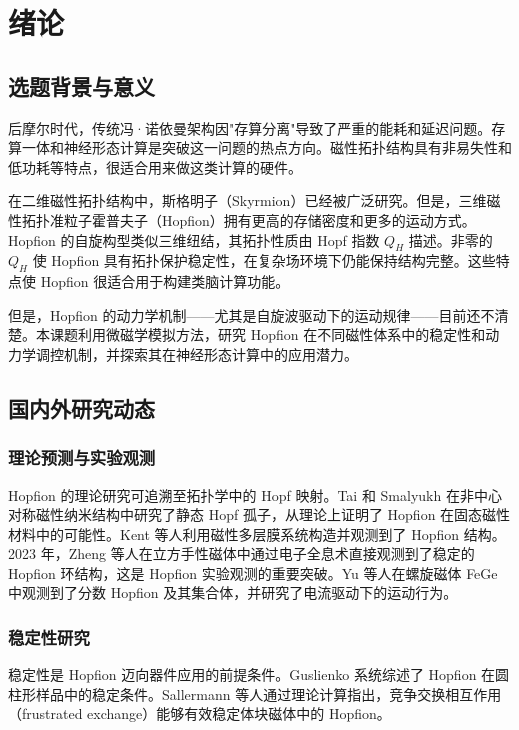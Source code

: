 \chapter{绪论}

\section{选题背景与意义}

后摩尔时代，传统冯·诺依曼架构因"存算分离"导致了严重的能耗和延迟问题。存算一体和神经形态计算是突破这一问题的热点方向。磁性拓扑结构具有非易失性和低功耗等特点，很适合用来做这类计算的硬件。

在二维磁性拓扑结构中，斯格明子（Skyrmion）已经被广泛研究。但是，三维磁性拓扑准粒子霍普夫子（Hopfion）拥有更高的存储密度和更多的运动方式\cite{gobel2021beyond}。Hopfion 的自旋构型类似三维纽结，其拓扑性质由 Hopf 指数 $Q_H$ 描述。非零的 $Q_H$ 使 Hopfion 具有拓扑保护稳定性，在复杂场环境下仍能保持结构完整。这些特点使 Hopfion 很适合用于构建类脑计算功能\cite{guslienko2024review}。

但是，Hopfion 的动力学机制——尤其是自旋波驱动下的运动规律——目前还不清楚。本课题利用微磁学模拟方法，研究 Hopfion 在不同磁性体系中的稳定性和动力学调控机制，并探索其在神经形态计算中的应用潜力。


\section{国内外研究动态}

\subsection{理论预测与实验观测}

Hopfion 的理论研究可追溯至拓扑学中的 Hopf 映射。Tai 和 Smalyukh 在非中心对称磁性纳米结构中研究了静态 Hopf 孤子\cite{tai2018static}，从理论上证明了 Hopfion 在固态磁性材料中的可能性。Kent 等人利用磁性多层膜系统构造并观测到了 Hopfion 结构\cite{kent2021creation}。2023 年，Zheng 等人在立方手性磁体中通过电子全息术直接观测到了稳定的 Hopfion 环结构\cite{zheng2023hopfion}，这是 Hopfion 实验观测的重要突破。Yu 等人在螺旋磁体 FeGe 中观测到了分数 Hopfion 及其集合体，并研究了电流驱动下的运动行为\cite{yu2023realization}。

\subsection{稳定性研究}

稳定性是 Hopfion 迈向器件应用的前提条件。Guslienko 系统综述了 Hopfion 在圆柱形样品中的稳定条件\cite{guslienko2024review}。Sallermann 等人通过理论计算指出，竞争交换相互作用（frustrated exchange）能够有效稳定体块磁体中的 Hopfion\cite{sallermann2023stability}。

